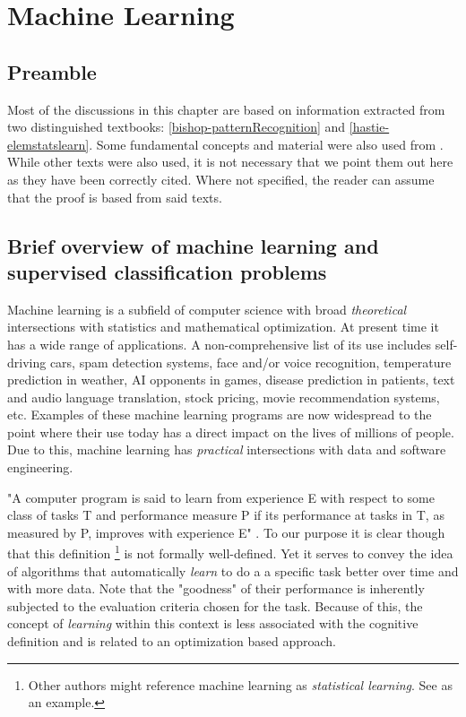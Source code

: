 \chapter{Machine Learning}
\label{cha:machine_learning}


\section{Preamble}\label{section-preamble}
Most of the discussions in this chapter are based on information extracted from two distinguished textbooks: \ref{bishop-patternRecognition} and  \ref{hastie-elemstatslearn}. Some fundamental concepts and material were also used from \label{scikit-learn}. While other texts were also used, it is not necessary that we point them out here as they have been correctly cited. Where not specified, the reader can assume that the proof is based from said texts.


\section{ Brief overview of machine learning and supervised classification problems}\label{section-introduction}

Machine learning is a subfield of computer science with broad \textit{theoretical} intersections with statistics and mathematical optimization. At present time it has a wide range of applications. A non-comprehensive list of its use includes self-driving cars, spam detection systems, face and/or voice recognition, temperature prediction in weather, AI opponents in games, disease prediction in patients, text and audio language translation, stock pricing, movie recommendation systems, etc. Examples of these machine learning programs are now widespread to the point where their use today has a direct impact on the lives of millions of people. Due to this, machine learning has \textit{practical} intersections with data and software engineering.

"A computer program is said to learn from experience E with respect to some class of tasks T and performance measure P if its performance at tasks in T, as measured by P, improves with experience E" \textcite{Mitchell-MLearning}. To our purpose it is clear though that this definition \footnote{Other authors might reference machine learning as \textit{statistical learning}. See \textcite{hastie-elemstatslearn} as an example.} is not formally well-defined. Yet it serves to convey the idea of algorithms that automatically \textit{learn} to do a a specific task better over time and with more data. Note that the "goodness" of their performance is inherently subjected to the evaluation criteria chosen for the task. Because of this, the concept of \textit{learning} within this context is less associated with the cognitive definition and is related to an optimization based approach.

